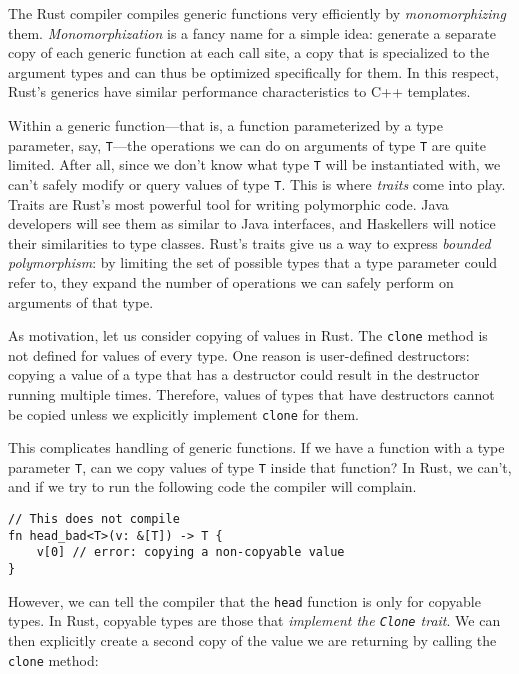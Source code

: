 \documentclass[]{article}
\begin{document}
The Rust compiler compiles generic functions very efficiently by
\emph{monomorphizing} them. \emph{Monomorphization} is a fancy name for
a simple idea: generate a separate copy of each generic function at each
call site, a copy that is specialized to the argument types and can thus
be optimized specifically for them. In this respect, Rust's generics
have similar performance characteristics to C++ templates.


Within a generic function---that is, a function parameterized by a type
parameter, say, \texttt{T}---the operations we can do on arguments of
type \texttt{T} are quite limited. After all, since we don't know what
type \texttt{T} will be instantiated with, we can't safely modify or
query values of type \texttt{T}. This is where \emph{traits} come into
play. Traits are Rust's most powerful tool for writing polymorphic code.
Java developers will see them as similar to Java interfaces, and
Haskellers will notice their similarities to type classes. Rust's traits
give us a way to express \emph{bounded polymorphism}: by limiting the
set of possible types that a type parameter could refer to, they expand
the number of operations we can safely perform on arguments of that
type.

As motivation, let us consider copying of values in Rust. The
\texttt{clone} method is not defined for values of every type. One
reason is user-defined destructors: copying a value of a type that has a
destructor could result in the destructor running multiple times.
Therefore, values of types that have destructors cannot be copied unless
we explicitly implement \texttt{clone} for them.

This complicates handling of generic functions. If we have a function
with a type parameter \texttt{T}, can we copy values of type \texttt{T}
inside that function? In Rust, we can't, and if we try to run the
following code the compiler will complain.

\begin{verbatim}
// This does not compile
fn head_bad<T>(v: &[T]) -> T {
    v[0] // error: copying a non-copyable value
}
\end{verbatim}

However, we can tell the compiler that the \texttt{head} function is
only for copyable types. In Rust, copyable types are those that
\emph{implement the \texttt{Clone} trait}. We can then explicitly create
a second copy of the value we are returning by calling the
\texttt{clone} method:
\end{document}
